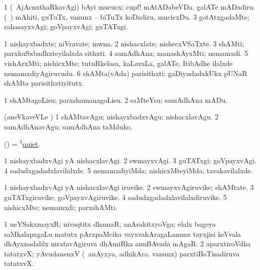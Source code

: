 \noindent
\gl{\pagu}
\bmng
\bnum
\num{1}  (\kanmu\ AjAcnxthaRkavAgi) bAyi mucucx; cupf! mAtADabeVDa. 
   
\banum
{} galATe mADadiru. 
 (\sA\ ) mAhiti, guTuTx, \mo vanunx -- biTuTx koDadiru, mucicxDu. 
\eanum
\numie
\num{3}  gotAtxgadaMte; rahasayxvAgi; goVpayxvAgi; guTATxgi. 
\enum
\emng
\eentry

\bentry
{}
\gl{\nA}
\bmng
\bnum
\num{1} nishayxbadxte; niVravate; mwna. 
\num{2} nishacxlate; nishecxVSaTxte. 
\num{3} shAMti; parxkuSxbadhxteyilalxda sithxti. 
\num{4} samAdhAna; manashAyxMti; nemamxdi. 
\num{5} vishArxMti; nishicxMte; tutuRkelasa, kaLavaLa, galATe, ItibAdhe ilalxde nemamxdiyAgiruvudu. 
\num{6} shAMta(vAda) parisithxti:  gaDiyudadxkUkx pUNaR shAMta parisithxtiyitutx. 
\enum
\emng
\eentry

\bentry
{}
\gl{\sakirx}
\bmng
\bnum
\num{1} shAMtagoLisu; parxshamanagoLisu. 
\num{2} saMteYsu; samAdhAna mADu. 
\enum
\emng

\noindent
\gl{\akirx}
\bmng
(aneVkaveVLe ) 
\bnum
\num{1} shAMtavAgu; nishayxbadxvAgu; nishacxlavAgu. 
\num{2} samAdhAnavAgu; samAdhAna taMduko. 
\enum
\emng
\eentry

\bentry
{}
\gl{\kirx}
\bmng
(\birx) = \hyperlink{quiet(3)}{$^3$quiet}. 
\emng
\eentry

\bentry
{}
\gl{\kirxvi}
\bmng
\bnum
\num{1} nishayxbadxvAgi yA nishacxlavAgi. 
\num{2} swmayxvAgi. 
\num{3} guTATxgi; goVpayxvAgi. 
\num{4} sadudxgadadxlavilalxde. 
\num{5} nemamxdiyiMda; nishicxMteyiMda; tavakavilalxde. 
\enum
\emng
\eentry

\bentry
{}
\gl{\nA}
\bmng
\bnum
\num{1} nishayxbadxvAgi yA nishacxlavAgi iruvike. 
\num{2} swmayxvAgiruvike; shAMtate. 
\num{3} guTATxgiruvike; goVpayxvAgiruvike. 
\num{4} sadudxgadadxlavilalxdiruvike. 
\num{5} nishicxMte; nemamxdi; parxshAMti. 
\enum
\emng
\eentry

\bentry
{}
\gl{\nA}
\bmng
\bnum
\num{1} neYSakxmayxR; nivaqtitx dhamaR; anAsakitxyoVga; elalx bageya saMkalapxgaLu matutx pArxpaMcika vayxvahAragaLanunx tayxjisi keVvala dhAyxnadalilx niratavAgiruva dhAmiRka anuBAvada mAgaR. 
\num{2} aparxtiroVdha tatatxvX; yAvudanenxV (\kanmu\ anAyxya, adhikAra, \mo vanunx) parxtiBaTisadiruva tatatxvX. 
\enum
\emng
\eentry

